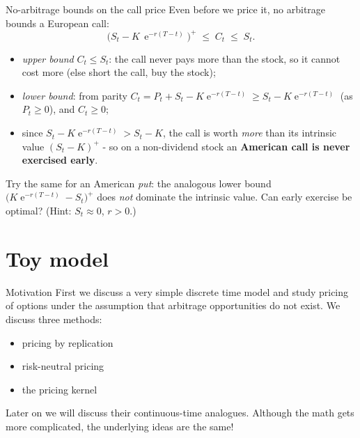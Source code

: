 \documentclass[pdf, handout]{beamer}
\newcommand{\e}{\operatorname{e}}
\begin{document}
\begin{frame}{No-arbitrage bounds on the call price}
Even before we price it, no arbitrage bounds a European call:
\[ \big(S_t-K\,\e^{-r(T-t)}\big)^+ \;\le\; C_t \;\le\; S_t . \]
\begin{itemize}
\item \emph{upper bound} $C_t\le S_t$: the call never pays more than the stock, so it cannot cost more (else short the call, buy the stock);
\item \emph{lower bound}: from parity $C_t=P_t+S_t-K\e^{-r(T-t)}\ge S_t-K\e^{-r(T-t)}$ (as $P_t\ge0$), and $C_t\ge0$;
\item since $S_t-K\e^{-r(T-t)}>S_t-K$, the call is worth \emph{more} than its intrinsic value $(S_t-K)^+$ - so on a non-dividend stock an \textbf{American call is never exercised early}.
\end{itemize}
\begin{fftbox}
Try the same for an American \emph{put}: the analogous lower bound $\bigl(K\e^{-r(T-t)}-S_t\bigr)^+$ does \emph{not} dominate the intrinsic value. Can early exercise be optimal? (Hint: $S_t\approx 0$, $r>0$.)
\end{fftbox}
\end{frame}

\section{Toy model}

\begin{frame}{Motivation}
First we discuss a very simple discrete time model and study pricing of options under the assumption that arbitrage opportunities do not exist.
We discuss three methods:
\begin{itemize}
\item pricing by replication
\item risk-neutral pricing
\item the pricing kernel
\end{itemize}
Later on we will discuss their continuous-time analogues.
Although the math gets more complicated, 
the underlying ideas are the same!
\end{frame}
\end{document}
